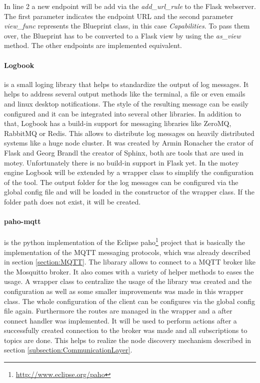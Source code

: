 In line 2 a new endpoint will be add via the \textit{add\_url\_rule} to the Flask webserver.
The first parameter indicates the endpoint \ac{URL} and the second parameter \textit{view\_func} represents the Blueprint class, in this case \textit{Capabilities}.
To pass them over, the Blueprint has to be converted to a Flask view by using the \textit{as\_view} method.
The other endpoints are implemented equivalent.

\paragraph{Logbook} is a small loging library that helps to standardize the output of log messages.
It helps to address several output methods like the terminal, a file or even emails and linux desktop notifications.
The style of the resulting message can be easily configured and it can be integrated into several other libraries.
In addition to that, Logbook has a build-in support for messaging libraries like ZeroMQ, RabbitMQ or Redis.
This allows to distribute log messages on heavily distributed systems like a huge node cluster.
It was created by Armin Ronacher the crator of Flask and Georg Brandl the creator of Sphinx, both are tools that are used in motey.
Unfortunately there is no build-in support in Flask yet.
In the motey engine Logbook will be extended by a wrapper class to simplify the configuration of the tool.
The output folder for the log messages can be configured via the global config file and will be loaded in the constructor of the wrapper class.
If the folder path does not exist, it will be created.

\paragraph{paho-mqtt} is the python implementation of the Eclipse paho\footnote{\url{http://www.eclipse.org/paho}} project that is basically the implementation of the \ac{MQTT} messaging protocols, which was already described in section \ref{section:MQTT}.
The libarary allows to connect to a \ac{MQTT} broker like the Mosquitto broker.
It also comes with a variety of helper methods to eases the usage.
A wrapper class to centralize the usage of the library was created and the configuration as well as some smaller improvements was made in this wrapper class.
The whole configuration of the client can be configures via the global config file again.
Furthermore the routes are managed in the wrapper and a after connect handler was implemented.
It will be used to perform actions after a successfully created connection to the broker was made and all subscriptions to topics are done.
This helps to realize the node discovery mechanism described in section \ref{subsection:CommunicationLayer}.

